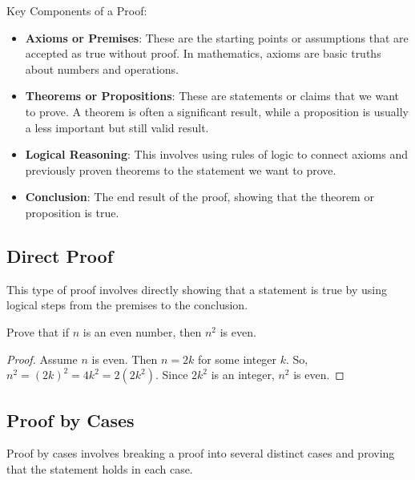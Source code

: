\documentclass{article}
\theoremstyle{mytheoremstyle}
\theoremstyle{mytheoremstyle}
\theoremstyle{myexamplestyle}
\begin{document}
Key Components of a Proof:
\begin{itemize}
    \item \textbf{Axioms or Premises}: These are the starting points or assumptions that are accepted as true without proof. In mathematics, axioms are basic truths about numbers and operations.
    \item \textbf{Theorems or Propositions}: These are statements or claims that we want to prove. A theorem is often a significant result, while a proposition is usually a less important but still valid result.
    \item \textbf{Logical Reasoning}: This involves using rules of logic to connect axioms and previously proven theorems to the statement we want to prove.
    \item \textbf{Conclusion}: The end result of the proof, showing that the theorem or proposition is true.
\end{itemize}

\subsection{Direct Proof}

This type of proof involves directly showing that a statement is
true by using logical steps from the premises to the conclusion.

\begin{example}
    Prove that if \( n \) is an even number, then \( n^2 \) is even.
    \begin{proof}
        Assume \( n \) is even. Then \( n = 2k \) for some integer \( k \). So, \( n^2 = (2k)^2 = 4k^2 = 2(2k^2) \). Since \( 2k^2 \) is an integer, \( n^2 \) is even.
    \end{proof}
\end{example}


\subsection{Proof by Cases}

Proof by cases involves breaking a proof into several distinct cases and proving that the statement holds in each case.
\end{document}
